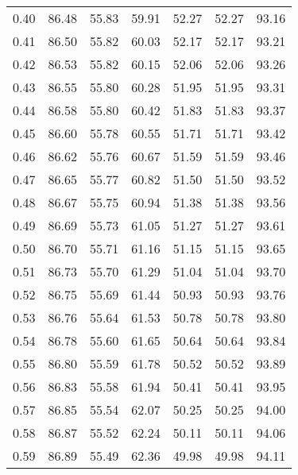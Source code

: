 \begin{tabular}{|c|c|c|c|c|c|c|}
      0.40 &     86.48 &     55.83 &      59.91 &   52.27 &      52.27 &         93.16 \\
      0.41 &     86.50 &     55.82 &      60.03 &   52.17 &      52.17 &         93.21 \\
      0.42 &     86.53 &     55.82 &      60.15 &   52.06 &      52.06 &         93.26 \\
      0.43 &     86.55 &     55.80 &      60.28 &   51.95 &      51.95 &         93.31 \\
      0.44 &     86.58 &     55.80 &      60.42 &   51.83 &      51.83 &         93.37 \\
      0.45 &     86.60 &     55.78 &      60.55 &   51.71 &      51.71 &         93.42 \\
      0.46 &     86.62 &     55.76 &      60.67 &   51.59 &      51.59 &         93.46 \\
      0.47 &     86.65 &     55.77 &      60.82 &   51.50 &      51.50 &         93.52 \\
      0.48 &     86.67 &     55.75 &      60.94 &   51.38 &      51.38 &         93.56 \\
      0.49 &     86.69 &     55.73 &      61.05 &   51.27 &      51.27 &         93.61 \\
      0.50 &     86.70 &     55.71 &      61.16 &   51.15 &      51.15 &         93.65 \\
      0.51 &     86.73 &     55.70 &      61.29 &   51.04 &      51.04 &         93.70 \\
      0.52 &     86.75 &     55.69 &      61.44 &   50.93 &      50.93 &         93.76 \\
      0.53 &     86.76 &     55.64 &      61.53 &   50.78 &      50.78 &         93.80 \\
      0.54 &     86.78 &     55.60 &      61.65 &   50.64 &      50.64 &         93.84 \\
      0.55 &     86.80 &     55.59 &      61.78 &   50.52 &      50.52 &         93.89 \\
      0.56 &     86.83 &     55.58 &      61.94 &   50.41 &      50.41 &         93.95 \\
      0.57 &     86.85 &     55.54 &      62.07 &   50.25 &      50.25 &         94.00 \\
      0.58 &     86.87 &     55.52 &      62.24 &   50.11 &      50.11 &         94.06 \\
      0.59 &     86.89 &     55.49 &      62.36 &   49.98 &      49.98 &         94.11 \\

\end{tabular}
